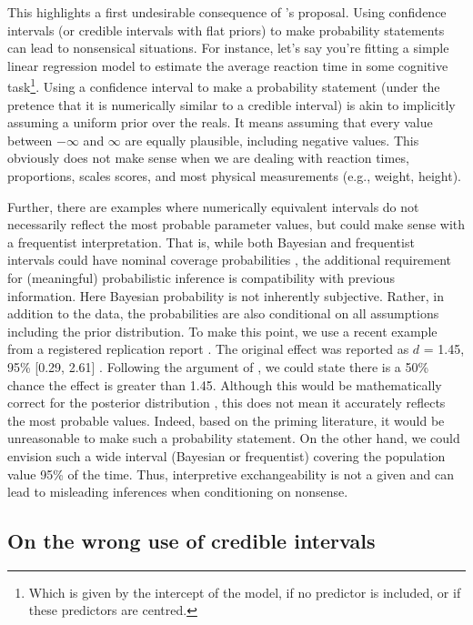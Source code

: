 \documentclass[a4paper,man,natbib,floatsintext,donotrepeattitle]{apa6}
\begin{document}
 This highlights a first undesirable consequence of \cite{albers_credible_2018}'s proposal. Using confidence intervals (or credible intervals with flat priors) to make probability statements can lead to nonsensical situations. For instance, let's say you're fitting a simple linear regression model to estimate the average reaction time in some cognitive task\footnote{Which is given by the intercept of the model, if no predictor is included, or if these predictors are centred.}. Using a confidence interval to make a probability statement (under the pretence that it is numerically similar to a credible interval) is akin to implicitly assuming a uniform prior over the reals. It means assuming that every value between $-\infty$ and $\infty$ are equally plausible, including negative values. This obviously does not make sense when we are dealing with reaction times, proportions, scales scores, and most physical measurements (e.g., weight, height).
 
 Further, there are examples where numerically equivalent intervals do not necessarily reflect the most probable parameter values, but could make sense with a frequentist interpretation. That is, while both Bayesian and frequentist intervals could have nominal coverage probabilities \citep{albers_credible_2018}, the additional requirement for (meaningful) probabilistic inference is compatibility with previous information. Here Bayesian probability is not inherently subjective. Rather, in addition to the data, the probabilities are also conditional on all assumptions including the prior distribution. To make this point, we use a recent example from a registered replication report \citep{verschuere_registered_2018}. The original effect was reported as $d$ = 1.45, 95\% [0.29, 2.61] \citep{mazar_dishonesty_2008}. Following the argument of \cite{albers_credible_2018}, we could state there is a 50\% chance the effect is greater than 1.45. Although this would be mathematically correct for the posterior distribution \citep{gelman_p_2013}, this does not mean it accurately reflects the most probable values. Indeed, based on the priming literature, it would be unreasonable to make such a probability statement. On the other hand, we could envision such a wide interval (Bayesian or frequentist) covering the population value 95\% of the time. Thus, interpretive exchangeability is not a given and can lead to misleading inferences when conditioning on nonsense.

\subsection{On the wrong use of credible intervals}
\end{document}
